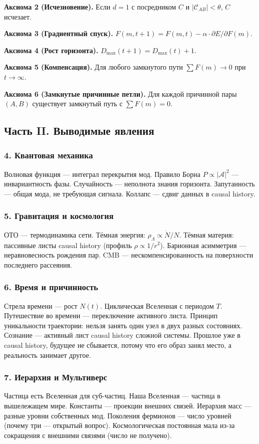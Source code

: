 \documentclass[12pt,a4paper]{article}
\begin{document}
\textbf{Аксиома 2 (Исчезновение).} Если $d=1$ с посредником $C$ и $|\mathcal{C}_{AB}| < \theta$, $C$ исчезает.

\textbf{Аксиома 3 (Градиентный спуск).} $F(m,t+1) = F(m,t) - \alpha \cdot \partial E/\partial F(m)$.

\textbf{Аксиома 4 (Рост горизонта).} $D_{\max}(t+1) = D_{\max}(t) + 1$.

\textbf{Аксиома 5 (Компенсация).} Для любого замкнутого пути $\sum F(m) \to 0$ при $t \to \infty$.

\textbf{Аксиома 6 (Замкнутые причинные петли).} Для каждой причинной пары $(A,B)$ существует замкнутый путь с $\sum F(m) = 0$.

\subsection{Часть II. Выводимые явления}

\subsubsection{4. Квантовая механика}
Волновая функция --- интеграл перекрытия мод. Правило Борна $P \propto |\mathcal{A}|^2$ --- инвариантность фазы. Случайность --- неполнота знания горизонта. Запутанность --- общая мода, не требующая сигнала. Коллапс --- сдвиг данных в causal history.

\subsubsection{5. Гравитация и космология}
ОТО --- термодинамика сети. Тёмная энергия: $\rho_\Lambda \propto \dot{N}/N$. Тёмная материя: пассивные листы causal history (профиль $\rho \propto 1/r^2$). Барионная асимметрия --- неравновесность рождения пар. CMB --- нескомпенсированность на поверхности последнего рассеяния.

\subsubsection{6. Время и причинность}
Стрела времени --- рост $N(t)$. Циклическая Вселенная с периодом $T$. Путешествие во времени --- переключение активного листа. Принцип уникальности траектории: нельзя занять один узел в двух разных состояниях. Сознание --- активный лист causal history сложной системы. Прошлое уже в causal history, будущее не сбывается, потому что его образ занял место, а реальность занимает другое.

\subsubsection{7. Иерархия и Мультиверс}
Частица есть Вселенная для суб-частиц. Наша Вселенная --- частица в вышележащем мире. Константы --- проекции внешних связей. Иерархия масс --- разные уровни собственных мод. Поколения фермионов --- число уровней (почему три --- открытый вопрос). Космологическая постоянная мала из-за сокращения с внешними связями (число не получено).
\end{document}
